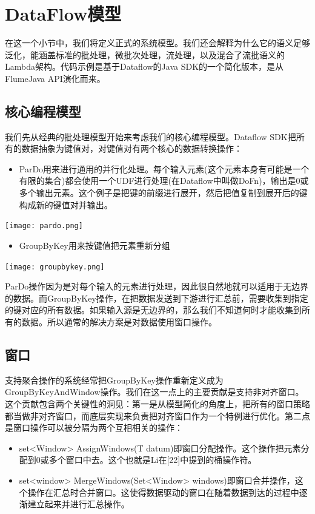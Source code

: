 \documentclass[oneside]{ctexbook}
\begin{document}
\section{DataFlow模型}

在这一个小节中，我们将定义正式的系统模型。我们还会解释为什么它的语义足够泛化，能涵盖标准的批处理，微批次处理，流处理，以及混合了流批语义的Lambda架构。代码示例是基于Dataflow的Java SDK的一个简化版本，是从FlumeJava API演化而来。

\subsection{核心编程模型}

我们先从经典的批处理模型开始来考虑我们的核心编程模型。Dataflow SDK把所有的数据抽象为键值对，对键值对有两个核心的数据转换操作：

\begin{itemize}
\item ParDo用来进行通用的并行化处理。每个输入元素(这个元素本身有可能是一个有限的集合)都会使用一个UDF进行处理(在Dataflow中叫做DoFn)，输出是0或多个输出元素。这个例子是把键的前缀进行展开，然后把值复制到展开后的键构成新的键值对并输出。
\end{itemize}

\noindent \texttt{[image: pardo.png]}

\begin{itemize}
\item GroupByKey用来按键值把元素重新分组
\end{itemize}

\noindent \texttt{[image: groupbykey.png]}

ParDo操作因为是对每个输入的元素进行处理，因此很自然地就可以适用于无边界的数据。而GroupByKey操作，在把数据发送到下游进行汇总前，需要收集到指定的键对应的所有数据。如果输入源是无边界的，那么我们不知道何时才能收集到所有的数据。所以通常的解决方案是对数据使用窗口操作。

\subsection{窗口}

支持聚合操作的系统经常把GroupByKey操作重新定义成为GroupByKeyAndWindow操作。我们在这一点上的主要贡献是支持非对齐窗口。这个贡献包含两个关键性的洞见：第一是从模型简化的角度上，把所有的窗口策略都当做非对齐窗口，而底层实现来负责把对齐窗口作为一个特例进行优化。第二点是窗口操作可以被分隔为两个互相相关的操作：

\begin{itemize}
\item set<Window> AssignWindows(T datum)即窗口分配操作。这个操作把元素分配到0或多个窗口中去。这个也就是Li在[22]中提到的桶操作符。
\item set<window> MergeWindows(Set<Window>  windows)即窗口合并操作，这个操作在汇总时合并窗口。这使得数据驱动的窗口在随着数据到达的过程中逐渐建立起来并进行汇总操作。
\end{itemize}
\end{document}
